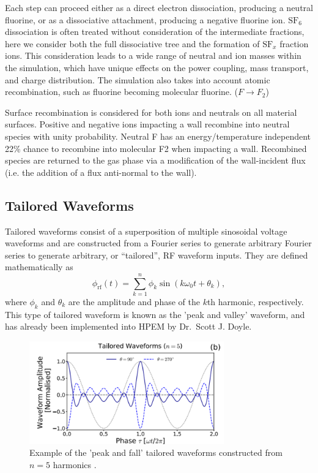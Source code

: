 \documentclass[12pt]{article}
\begin{document}
Each step can proceed either as a direct electron dissociation, producing a neutral fluorine, or as a dissociative attachment, producing a negative fluorine ion. $\text{SF}_6$ dissociation is often treated without consideration of the intermediate fractions, here we consider both the full dissociative tree and the formation of $\text{SF}_x$ fraction ions. This consideration leads to a wide range of neutral and ion masses within the simulation, which have unique effects on the power coupling, mass transport, and charge distribution. The simulation also takes into account atomic recombination, such as fluorine becoming molecular fluorine.  ($F \rightarrow F_2$)

Surface recombination is considered for both ions and neutrals on all material surfaces. Positive and negative ions impacting a wall recombine into neutral species with unity probability. Neutral F has an energy/temperature independent 22\% chance to recombine into molecular F2 when impacting a wall. Recombined species are returned to the gas phase via a modification of the wall-incident flux (i.e. the addition of a flux anti-normal to the wall).

\subsection{Tailored Waveforms}

Tailored waveforms consist of a superposition of multiple sinosoidal voltage waveforms and are constructed from a Fourier series to generate arbitrary Fourier series to generate arbitrary, or 
``tailored'', RF waveform inputs. They are defined mathematically as
\begin{equation}
    \phi_{\text{rf}}(t) = \sum_{k=1}^{n} \phi_k \sin(k\omega_0 t + \theta_k),
\end{equation}
where $\phi_k$ and $\theta_k$ are the amplitude and phase of the $k$th harmonic, 
respectively. This type of tailored waveform is known as the 'peak and valley' 
waveform, and has already been implemented into HPEM by Dr.\ Scott J. Doyle. 

\begin{figure}[H]
    \centering
    \includegraphics[width=0.75\textwidth]{Figures/TW.png} %
    \caption{Example of the 'peak and fall' tailored waveforms constructed from $n=5$ harmonics 
    \cite{Doyle2020}.}
    \label{fig:tailored}
\end{figure}
\end{document}
